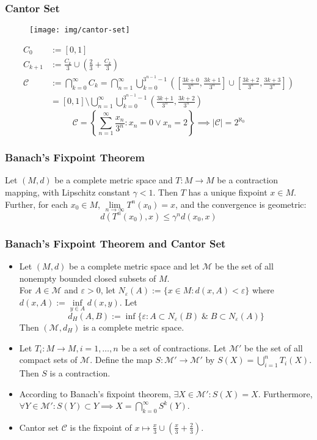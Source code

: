 \documentclass[UTF8,aspectratio=43,11pt,colorlinks,compress,openany]{beamer}%
\begin{document}
\begin{frame}\frametitle{Cantor Set}
	\begin{center}
		\begin{figure}
			\texttt{[image: img/cantor-set]}
		\end{figure}
	\end{center}
	\begin{align*}
	C_0&:=[0,1]\\
	C_{k+1}&:={\frac {C_k}{3}}\cup \left({\frac {2}{3}}+{\frac {C_k}{3}}\right)\\
	\mathcal{C}&:=\bigcap\limits_{k=0}^\infty C_k=
	\bigcap\limits_{n=1}^\infty\bigcup\limits_{k=0}^{3^{n-1}-1}\left(\left[{\frac{3k+0}{3^{n}}},{\frac{3k+1}{3^{n}}}\right]\cup \left[{\frac {3k+2}{3^{n}}},{\frac {3k+3}{3^{n}}}\right]\right)\\
	&=[0,1]\setminus\bigcup\limits_{n=1}^\infty\bigcup\limits_{k=0}^{3^{n-1}-1}\left({\frac{3k+1}{3^{n}}},{\frac {3k+2}{3^{n}}}\right)
	\end{align*}
	\[\mathcal{C}=\left\{\sum\limits_{n=1}^\infty\frac{x_n}{3^n}: x_n=0\vee x_n=2\right\}\implies |\mathcal{C}|=2^{\aleph_0}\]
\end{frame}

\begin{frame}\frametitle{Banach's Fixpoint Theorem}
	\begin{theorem}
		Let $(M,d)$ be a complete metric space and $T: M\to M$ be a contraction mapping, with Lipschitz constant $\gamma<1$. Then $T$ has a unique fixpoint $x\in M$. Further, for each $x_0\in M$, $\lim\limits_{n\to\infty}T^n(x_0)=x$, and the convergence is geometric:
		\[d(T^n(x_0),x)\leq\gamma^n d(x_0,x)\]
	\end{theorem}
\end{frame}

\begin{frame}\frametitle{Banach's Fixpoint Theorem and Cantor Set}
	\begin{itemize}
		\item Let $(M,d)$ be a complete metric space and let $\mathcal{M}$ be the set of all nonempty bounded closed subsets of $M$.\\
		For $A\in\mathcal{M}$ and $\varepsilon>0$, let $N_\varepsilon(A):=\big\{x\in M: d(x,A)<\varepsilon\big\}$ where $d(x,A):=\inf\limits_{y\in A}d(x,y)$. Let \[d_H(A,B):=\inf\big\{\varepsilon: A\subset N_\varepsilon(B)\;\&\;B\subset N_\varepsilon(A)\big\}\]
		Then $(\mathcal{M},d_H)$ is a complete metric space.
		\item Let $T_i: M\to M, i=1,\dots,n$ be a set of contractions. Let $\mathcal{M}'$ be the set of all compact sets of $\mathcal{M}$. Define the map $S:\mathcal{M}'\to\mathcal{M}'$ by $S(X)=\bigcup\limits_{i=1}^n T_i(X)$.
		Then $S$ is a contraction.
		\item According to Banach's fixpoint theorem, $\exists X\in\mathcal{M}': S(X)=X$. Furthermore, $\forall Y\in\mathcal{M}': S(Y)\subset Y\implies X=\bigcap\limits_{k=0}^\infty S^k(Y)$.
		\item Cantor set $\mathcal{C}$ is the fixpoint of $x\mapsto\frac{x}{3}\cup\left(\frac{x}{3}+\frac{2}{3}\right)$.
	\end{itemize}
\end{frame}
\end{document}
